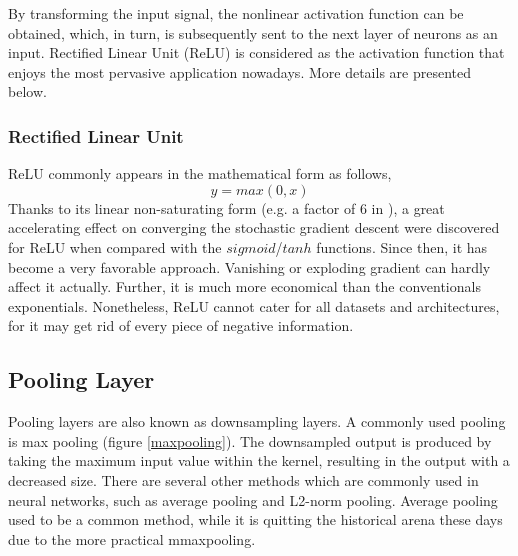    By transforming the input signal, the nonlinear activation function can be obtained, which, in turn,  is subsequently sent to the next layer of neurons as an input. Rectified Linear Unit (ReLU) is considered as the activation function that enjoys the most pervasive application nowadays. More details are presented below. 

    \subsubsection{Rectified Linear Unit}
    ReLU commonly appears in the mathematical form as follows,
    \begin{equation}
        y = max(0, x)
    \end{equation}
    Thanks to its linear non-saturating form (e.g. a factor of 6 in \cite{krizhevsky2012imagenet}), a great accelerating effect on converging the stochastic gradient descent were discovered for ReLU when compared with the $sigmoid$/$tanh$ functions. Since then, it has become a very favorable approach. Vanishing or exploding gradient can hardly affect it actually. Further, it is much more economical than the conventionals exponentials. Nonetheless, ReLU cannot cater for all datasets and architectures, for it may get rid of every piece of negative information.

    \subsection{Pooling Layer}
    Pooling layers are also known as downsampling layers. A commonly used pooling is max pooling (figure \ref{maxpooling}). The downsampled output is produced by taking the maximum input value within the kernel, resulting in the output with a decreased size. There are several other methods which are commonly used in neural networks, such as average pooling and L2-norm pooling. Average pooling used to be a common method, while it is quitting the historical arena these days due to the more practical mmaxpooling\cite{scherer2010evaluation}.

